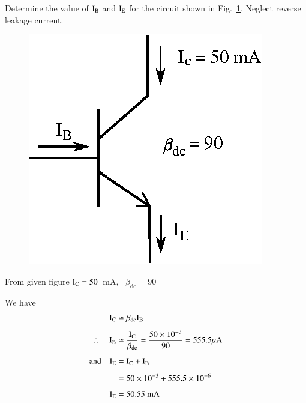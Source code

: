 \begin{problem}\label{prob2.10}
Determine the value of $\textrm{I}_{\textrm{B}}$ and $\textrm{I}_{\textrm{E}}$ for the circuit shown in Fig.~\ref{fig2.7}. Neglect reverse leakage current.
\begin{figure}[H]
\centering
\includegraphics{chap2/fig7.eps}
\caption{}\label{fig2.7}
\end{figure}
\end{problem}

\eject

\begin{solution}
From given figure $\textrm{I}_{\textrm{C}}=50$~mA, \ $\beta_{\text{dc}}=90$

We have
\begin{align*}
\textrm{I}_{\textrm{C}} &\simeq \beta_{\text{dc}}\textrm{I}_{\textrm{B}}\\[4pt]
\therefore\quad \textrm{I}_{\textrm{B}} &\simeq \frac{\textrm{I}_{\textrm{C}}}{\beta_{\text{dc}}}=\dfrac{50\times 10^{-3}}{90}=555.5\mu\textrm{A}\\[4pt]
\text{and}\quad \textrm{I}_{\textrm{E}} &= \textrm{I}_{\textrm{C}}+\textrm{I}_{\textrm{B}}\\[4pt]
&= 50\times 10^{-3}+555.5\times 10^{-6}\\[4pt]
\textrm{I}_{\textrm{E}} &= 50.55\text{~mA}
\end{align*}
\end{solution}

